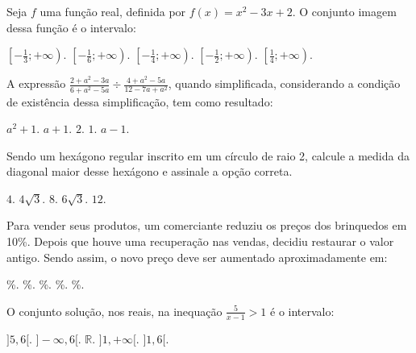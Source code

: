 \begin{question}%
Seja \(f\) uma função real, definida por \(f(x) = x^2 - 3x +2\). O conjunto imagem dessa função é o intervalo:
    \begin{tasks}
        \task \(\left[ -\frac{1}{3}; + \infty \right)\).
        \task \(\left[ -\frac{1}{6}; + \infty \right)\).
        \task \(\left[ -\frac{1}{4}; + \infty \right)\).
        \task \(\left[ -\frac{1}{2}; + \infty \right)\).
        \task \(\left[ \frac{1}{4}; + \infty \right)\).
    \end{tasks}
\end{question}

\begin{question}%
A expressão \(\frac{2+a^2-3a}{6+a^2-5a} \div \frac{4+a^2-5a}{12-7a+a^2}\), quando simplificada, considerando a condição de existência dessa simplificação, tem como resultado:
    \begin{tasks}
        \task \( a^2 + 1\).
        \task \( a+1\).
        \task \( 2\).
        \task \( 1\).
        \task \( a-1\).
    \end{tasks}
\end{question}

\begin{question}%
Sendo um hexágono regular inscrito em um círculo de raio 2, calcule a medida da diagonal maior desse hexágono e assinale a opção correta.
    \begin{tasks}
        \task \(4\).
        \task \(4\sqrt{3}\).
        \task \(8\).
        \task \(6\sqrt{3}\).
        \task \(12\).
    \end{tasks}
\end{question}

\begin{question}%
Para vender seus produtos, um comerciante reduziu os preços dos brinquedos em 10\%. Depois que houve uma recuperação nas vendas, decidiu restaurar o valor antigo. Sendo assim, o novo preço deve ser aumentado aproximadamente em:
    \begin{tasks}
        \%.
        \%.
        \%.
        \%.
        \%.
    \end{tasks}
\end{question}

\begin{question}%
O conjunto solução, nos reais, na inequação \(\frac{5}{x-1}> 1\) é o intervalo:
    \begin{tasks}
        \task \(]5,6[\).
        \task \(]-\infty,6[\).
        \task \(\mathbb{R}\).
        \task \(]1, +\infty[\).
        \task \(]1,6[\).
    \end{tasks}
\end{question}

